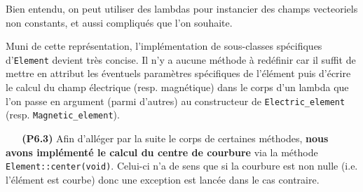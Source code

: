 \documentclass[12pt, letterpaper, twoside]{article}
\newcommand{\T}[1]{\texttt{#1}}
\begin{document}
\noindent Bien entendu, on peut utiliser des lambdas pour instancier des champs vecteoriels non constants, et aussi compliqués que l'on souhaite.

Muni de cette représentation, l'implémentation de sous-classes spécifiques d'\T{Element} devient très concise. Il n'y a aucune méthode à redéfinir car il suffit de mettre en attribut les éventuels paramètres spécifiques de l'élément puis d'écrire le calcul du champ électrique (resp. magnétique) dans le corps d'un lambda que l'on passe en argument (parmi d'autres) au constructeur de \T{Electric\_element} (resp. \T{Magnetic\_element}).

\ \linebreak
\ \linebreak
\textbf{(P6.3)} Afin d'alléger par la suite le corps de certaines méthodes, \textbf{nous avons implémenté le calcul du centre de courbure} via la méthode \T{Element::center(void)}. Celui-ci n'a de sens que si la courbure est non nulle (i.e. l'élément est courbe) donc une exception est lancée dans le cas contraire.
\end{document}
